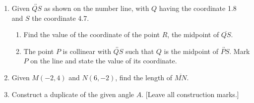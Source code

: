 \documentclass[12pt, oneside]{article}
\begin{document}
\begin{enumerate}
  \item Given $\overleftrightarrow{QS}$ as shown on the number line, with $Q$ having the coordinate 1.8 and $S$ the coordinate 4.7. \\[6pt] %
     \bigskip
    \begin{enumerate}
      \item Find the value of the coordinate of the point $R$, the midpoint of $\overline{QS}$. \vspace{3cm}
      \item The point $P$ is collinear with $\overleftrightarrow{QS}$ such that $Q$ is the midpoint of $\overleftrightarrow{PS}$. Mark $P$ on the line and state the value of its coordinate.
    \end{enumerate} %

\newpage

  \item Given $M(-2,4)$ and $N(6,-2)$, find the length of $\overline{MN}$.
      \vspace{6cm}

  \item Construct a duplicate of the given angle $A$.  [Leave all construction marks.]\\[3cm]

\newpage


\end{enumerate}
\end{document}
